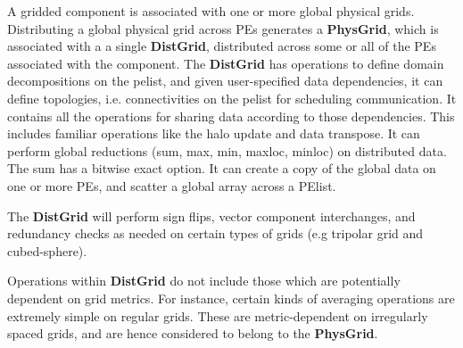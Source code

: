 A gridded component is associated with one or more global physical
grids.  Distributing a global physical grid across PEs generates a
\textbf{PhysGrid}, which is associated with a a single
\textbf{DistGrid}, distributed across some or all of the PEs
associated with the component. The \textbf{DistGrid} has operations to
define domain decompositions on the pelist, and given user-specified
data dependencies, it can define topologies, i.e. connectivities on
the pelist for scheduling communication. It contains all the
operations for sharing data according to those dependencies.  This
includes familiar operations like the halo update and data transpose.
It can perform global reductions (sum, max, min, maxloc, minloc) on
distributed data.  The sum has a bitwise exact option. It can create a
copy of the global data on one or more PEs, and scatter a global array
across a PElist.

The \textbf{DistGrid} will perform sign flips, vector component interchanges,
and redundancy checks as needed on certain types of grids (e.g
tripolar grid and cubed-sphere).

Operations within \textbf{DistGrid} do not include those which are
potentially dependent on grid metrics. For instance, certain kinds of
averaging operations are extremely simple on regular grids. These are
metric-dependent on irregularly spaced grids, and are hence considered
to belong to the \textbf{PhysGrid}.

